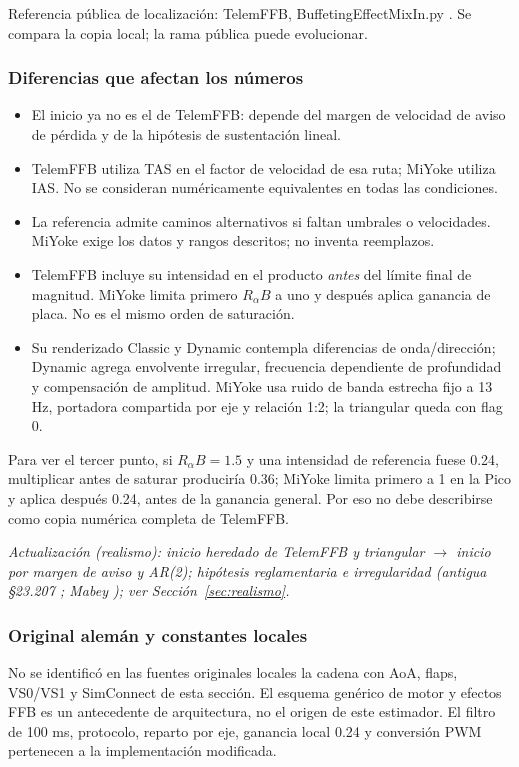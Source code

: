 Referencia pública de localización: TelemFFB, BuffetingEffectMixIn.py \cite{telemffb}. Se compara la copia local; la rama pública puede evolucionar.

\subsubsection{Diferencias que afectan los números}
\begin{itemize}
\item El inicio ya no es el de TelemFFB: depende del margen de velocidad de aviso de pérdida y de la hipótesis de sustentación lineal.
\item TelemFFB utiliza TAS en el factor de velocidad de esa ruta; MiYoke utiliza IAS. No se consideran numéricamente equivalentes en todas las condiciones.
\item La referencia admite caminos alternativos si faltan umbrales o velocidades. MiYoke exige los datos y rangos descritos; no inventa reemplazos.
\item TelemFFB incluye su intensidad en el producto \emph{antes} del límite final de magnitud. MiYoke limita primero $R_\alpha B$ a uno y después aplica ganancia de placa. No es el mismo orden de saturación.
\item Su renderizado Classic y Dynamic contempla diferencias de onda/dirección; Dynamic agrega envolvente irregular, frecuencia dependiente de profundidad y compensación de amplitud. MiYoke usa ruido de banda estrecha fijo a 13 Hz, portadora compartida por eje y relación 1:2; la triangular queda con flag 0.
\end{itemize}
Para ver el tercer punto, si $R_\alpha B=1.5$ y una intensidad de referencia fuese 0.24, multiplicar antes de saturar produciría 0.36; MiYoke limita primero a 1 en la Pico y aplica después 0.24, antes de la ganancia general. Por eso no debe describirse como copia numérica completa de TelemFFB.

\textit{Actualización (realismo): inicio heredado de TelemFFB y triangular $\rightarrow$ inicio por margen de aviso y AR(2); hipótesis reglamentaria e irregularidad (antigua §23.207 \cite{cfr23}; Mabey \cite{mabey1988}); ver Sección~\ref{sec:realismo}.}

\subsubsection{Original alemán y constantes locales}
No se identificó en las fuentes originales locales la cadena con AoA, flaps, VS0/VS1 y SimConnect de esta sección. El esquema genérico de motor y efectos FFB es un antecedente de arquitectura, no el origen de este estimador. El filtro de 100 ms, protocolo, reparto por eje, ganancia local 0.24 y conversión PWM pertenecen a la implementación modificada.

